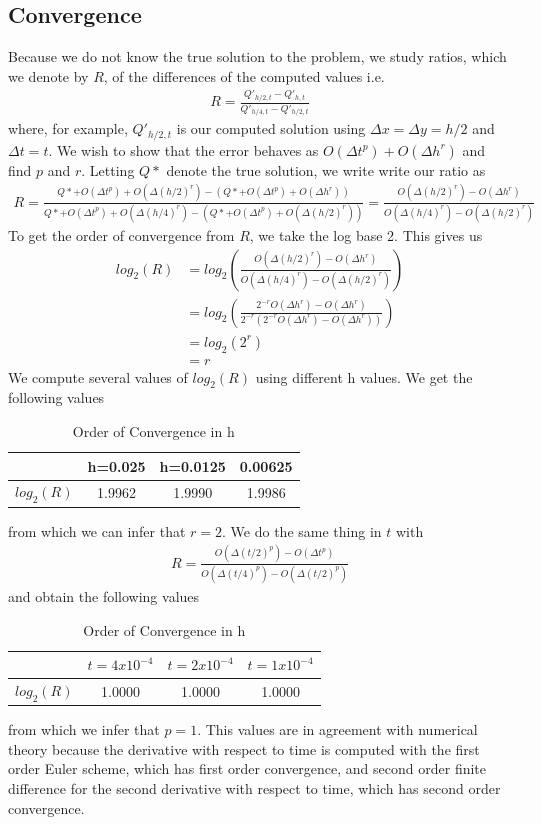 \subsection{Convergence}
Because we do not know the true solution to the problem, we study ratios, which we denote by $R$, of the differences of the computed values i.e. 
\begin{align*}
R=\frac{Q'_{h/2,t} - Q'_{h,t}}{Q'_{h/4,t} - Q'_{h/2,t}}
\end{align*}
where, for example, $Q'_{h/2,t}$ is our computed solution using $\Delta x = \Delta y = h/2$ and $\Delta t = t$. We wish to show that the error behaves as $O(\Delta t^p) + O(\Delta h^r)$ and find $p$ and $r$. Letting $Q*$ denote the true solution, we write write our ratio as  
\begin{align*}
R = \frac{Q*+O(\Delta t^p) + O(\Delta (h/2)^r) - (Q* + O(\Delta t^p) + O(\Delta h^r))}{Q*+O(\Delta t^p) + O(\Delta (h/4)^r) - (Q*+O(\Delta t^p) + O(\Delta (h/2)^r))} = \frac{O(\Delta (h/2)^r)-O(\Delta h^r)}{O(\Delta (h/4)^r) - O(\Delta (h/2)^r)}
\end{align*}
To get the order of convergence from $R$, we take the log base 2. This gives us 
\begin{align*}
log_2(R) &= log_2(\frac{O(\Delta (h/2)^r)-O(\Delta h^r)}{O(\Delta (h/4)^r) - O(\Delta (h/2)^r)}) \\ 
&= log_2(\frac{2^{-r}O(\Delta h^r)-O(\Delta h^r)}{2^{-r}(2^{-r}O(\Delta h^r)-O(\Delta h^r))}) \\
&= log_2(2^{r}) \\
&= r
\end{align*}
We compute several values of $log_2(R)$ using different h values. We get the following values
\begin{table}[]
\centering
\caption{Order of Convergence in h}
\label{my-label}
\begin{tabular}{|c|c|c|c|}
\hline 
 & h=0.025 & h=0.0125 & 0.00625 \\ 
\hline 
$log_2(R)$ & 1.9962 & 1.9990 & 1.9986 \\ 
\hline 
\end{tabular} 
\end{table}
from which we can infer that $r = 2$. We do the same thing in $t$ with
\begin{align*}
R = \frac{O(\Delta (t/2)^p)-O(\Delta t^p)}{O(\Delta (t/4)^p) - O(\Delta (t/2)^p)}
\end{align*} 
and obtain the following values
\begin{table}[]
\centering
\caption{Order of Convergence in h}
\label{my-label}
\begin{tabular}{|c|c|c|c|}
\hline 
 & $t=4x10^{-4}$ & $t=2x10^{-4}$ & $t=1x10^{-4}$ \\ 
\hline 
$log_2(R)$ & 1.0000 & 1.0000 & 1.0000 \\ 
\hline 
\end{tabular} 
\end{table}
from which we infer that $p=1$. This values are in agreement with numerical theory because the derivative with respect to time is computed with the first order Euler scheme, which has first order convergence, and second order finite difference for the second derivative with respect to time, which has second order convergence.   
